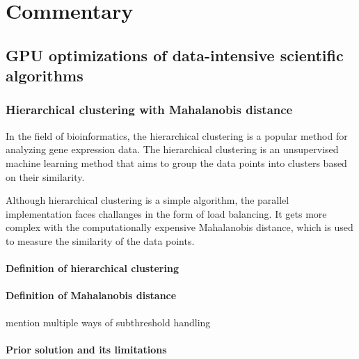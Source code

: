 \documentclass[12pt,a4paper]{report}
\begin{document}



\tableofcontents



\part{Commentary}




\chapter{GPU optimizations of data-intensive scientific algorithms}



\section{Hierarchical clustering with Mahalanobis distance}

In the field of bioinformatics, the hierarchical clustering is a popular method for analyzing gene expression data.
The hierarchical clustering is an unsupervised machine learning method that aims to group the data points into clusters based on their similarity.

Although hierarchical clustering is a simple algorithm, the parallel implementation faces challanges in the form of load balancing.
It gets more complex with the computationally expensive Mahalanobis distance, which is used to measure the similarity of the data points.

\subsection{Definition of hierarchical clustering}

\subsection{Definition of Mahalanobis distance}

mention multiple ways of subthreshold handling 

\subsection{Prior solution and its limitations}
\end{document}
